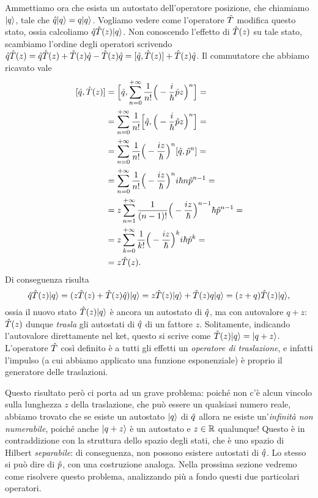 Ammettiamo ora che esista un autostato dell'operatore posizione, che chiamiamo $\lvert q\rangle$, tale che $\hat{q}\lvert q\rangle=q\lvert q\rangle$.
Vogliamo vedere come l'operatore $\hat{T}$ modifica questo stato, ossia calcoliamo $\hat{q}\hat{T}(z)\lvert q\rangle$.
Non conoscendo l'effetto di $\hat{T}(z)$ su tale stato, scambiamo l'ordine degli operatori scrivendo $\hat{q}\hat{T}(z)=\hat{q}\hat{T}(z)+\hat{T}(z)\hat{q}-\hat{T}(z)\hat{q}=[\hat{q},\hat{T}(z)]+\hat{T}(z)\hat{q}$.
Il commutatore che abbiamo ricavato vale
\begin{equation}
	\begin{split}
		[\hat{q},\hat{T}(z)]&=\Big[\hat{q},\sum_{n=0}^{+\infty}\frac1{n!}\Big(-\frac{i}{\hbar}\hat{p}z\Big)^n\Big]=\\
		&=\sum_{n=0}^{+\infty}\frac1{n!}\Big[\hat{q},\Big(-\frac{i}{\hbar}\hat{p}z\Big)^n\Big]=\\
		&=\sum_{n=0}^{+\infty}\frac1{n!}\Big(-\frac{iz}{\hbar}\Big)^n[\hat{q},\hat{p}^n]=\\
		&=\sum_{n=0}^{+\infty}\frac1{n!}\Big(-\frac{iz}{\hbar}\Big)^ni\hbar n\hat{p}^{n-1}=\\
		&=z\sum_{n=1}^{+\infty}\frac1{(n-1)!}\Big(-\frac{iz}{\hbar}\Big)^{n-1}\hbar\hat{p}^{n-1}=\\
		&=z\sum_{k=0}^{+\infty}\frac1{k!}\Big(-\frac{iz}{\hbar}\Big)^ki\hbar \hat{p}^k=\\
		&=z\hat{T}(z).
	\end{split}
	\label{eq:commutatore-posizione-traslazione}
\end{equation}
Di conseguenza risulta
\begin{equation}
	\hat{q}\hat{T}(z)\lvert q\rangle=(z\hat{T}(z)+\hat{T}(z)\hat{q})\lvert q\rangle=z\hat{T}(z)\lvert q\rangle+\hat{T}(z)q\lvert q\rangle=(z+q)\hat{T}(z)\lvert q\rangle,
\end{equation}
ossia il nuovo stato $\hat{T}(z)\lvert q\rangle$ è ancora un autostato di $\hat{q}$, ma con autovalore $q+z$: $\hat{T}(z)$ dunque \emph{trasla} gli autostati di $\hat{q}$ di un fattore $z$.
Solitamente, indicando l'autovalore direttamente nel ket, questo si scrive come $\hat{T}(z)\lvert q\rangle=\lvert q+z\rangle$.
L'operatore $\hat{T}$ cos\`i definito è a tutti gli effetti un \emph{operatore di traslazione}, e infatti l'impulso (a cui abbiamo applicato una funzione esponenziale) è proprio il generatore delle traslazioni.

Questo risultato però ci porta ad un grave problema: poich\'e non c'è alcun vincolo sulla lunghezza $z$ della traslazione, che può essere un qualsiasi numero reale, abbiamo trovato che se esiste un autostato $\lvert q\rangle$ di $\hat{q}$ allora ne esiste un'\emph{infinità non numerabile}, poich\'e anche $\lvert q+z\rangle$ è un autostato e $z\in\mathbb{R}$ qualunque!
Questo è in contraddizione con la struttura dello spazio degli stati, che è uno spazio di Hilbert \emph{separabile}: di conseguenza, non possono esistere autostati di $\hat{q}$.
Lo stesso si può dire di $\hat{p}$, con una costruzione analoga.
Nella prossima sezione vedremo come risolvere questo problema, analizzando più a fondo questi due particolari operatori.

